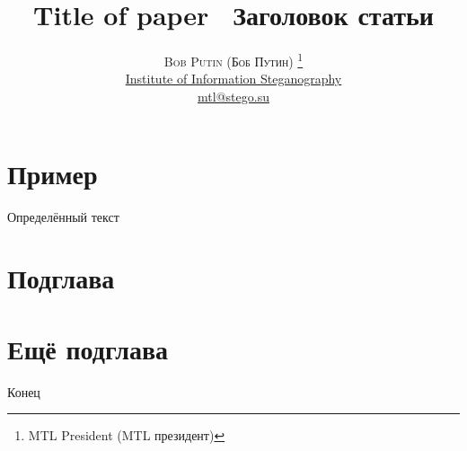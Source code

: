 \documentclass[twoside]{article}
\title{\vspace{-15mm}\fontsize{24pt}{10pt}\selectfont\textbf{
        Title of paper \ Заголовок статьи
    }} %
\author{
        \large
        \textsc{ Bob Putin (Боб Путин) }\thanks{MTL President (MTL президент)}\\[2mm] %
        \normalsize \href{ iis.stego.su  }{ Institute of Information Steganography } \\ %
        \normalsize \href{mailto: mtl@stego.su }{mtl@stego.su} %
        \vspace{-5mm}
    }
\date{}
\begin{document}
\maketitle\section{Пример}

Определённый текст

\section{Подглава}


\section{Ещё подглава}


Конец
\end{document}
